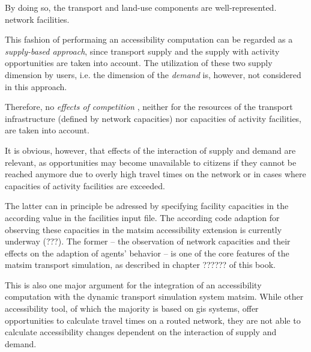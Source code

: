 By doing so, the transport and land-use components are well-represented.
network
facilities.


This fashion of performaing an accessibility computation can be regarded as a \textit{supply-based approach}, since 
transport supply and the supply with activity opportunities are taken into account. The utilization of these two 
supply dimension by users, i.e. the dimension of the \textit{demand} is, however, not considered in this approach.

Therefore, no \textit{effects of competition}
, neither for the resources of the transport infrastructure (defined by network 
capacities) nor capacities of activity facilities, are taken into account.

It is obvious, however, that effects of the interaction of supply and demand
are relevant, as opportunities may become unavailable to citizens if they cannot be reached anymore due to overly high 
travel times on the network or in cases where capacities of activity facilities are exceeded. 

The latter can in 
principle be adressed by specifying facility capacities in the according value in the facilities 
input file. The according code adaption for observing these capacities in the \gls{matsim} 
accessibility extension is currently underway  (???). The former -- the observation of network capacities and 
their effects on the adaption of agents' behavior -- is one of the core features of the \gls{matsim} transport 
simulation, as described in chapter ?????? of this book.


This is also one major argument for the integration of an accessibility computation with the dynamic transport 
simulation system \gls{matsim}. While other accessibility tool, of which the majority is based on \gls{gis} systems, 
offer opportunities to calculate travel times on a routed network, they are not able to calculate accessibility 
changes dependent on the interaction of supply and demand. 








